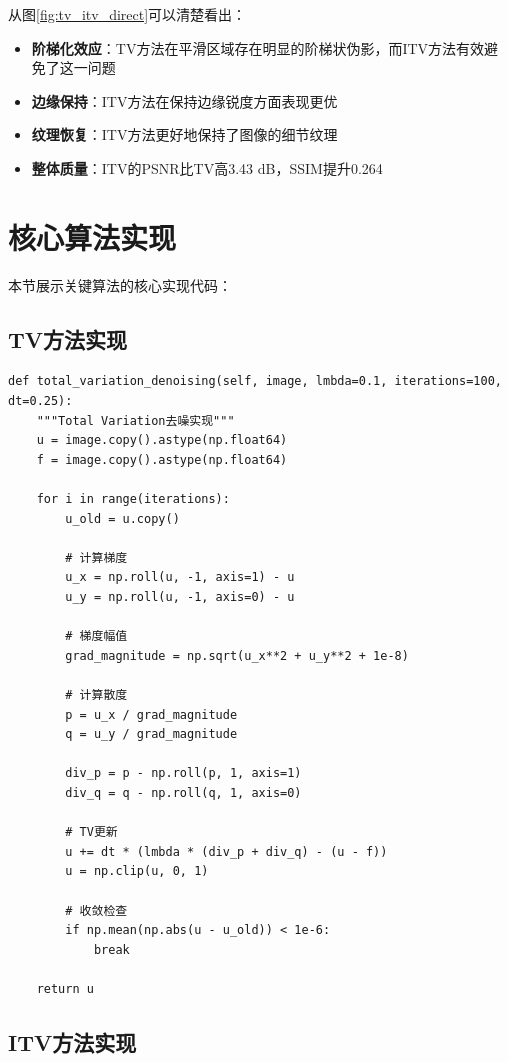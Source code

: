 \documentclass[a4paper,12pt]{ctexart}
\begin{document}
从图\ref{fig:tv_itv_direct}可以清楚看出：
\begin{itemize}
    \item \textbf{阶梯化效应}：TV方法在平滑区域存在明显的阶梯状伪影，而ITV方法有效避免了这一问题
    \item \textbf{边缘保持}：ITV方法在保持边缘锐度方面表现更优
    \item \textbf{纹理恢复}：ITV方法更好地保持了图像的细节纹理
    \item \textbf{整体质量}：ITV的PSNR比TV高3.43 dB，SSIM提升0.264
\end{itemize}

\section{核心算法实现}

本节展示关键算法的核心实现代码：

\subsection{TV方法实现}

\begin{lstlisting}[caption=TV方法核心代码,label=lst:tv]
def total_variation_denoising(self, image, lmbda=0.1, iterations=100, dt=0.25):
    """Total Variation去噪实现"""
    u = image.copy().astype(np.float64)
    f = image.copy().astype(np.float64)
    
    for i in range(iterations):
        u_old = u.copy()
        
        # 计算梯度
        u_x = np.roll(u, -1, axis=1) - u
        u_y = np.roll(u, -1, axis=0) - u
        
        # 梯度幅值
        grad_magnitude = np.sqrt(u_x**2 + u_y**2 + 1e-8)
        
        # 计算散度
        p = u_x / grad_magnitude
        q = u_y / grad_magnitude
        
        div_p = p - np.roll(p, 1, axis=1)
        div_q = q - np.roll(q, 1, axis=0)
        
        # TV更新
        u += dt * (lmbda * (div_p + div_q) - (u - f))
        u = np.clip(u, 0, 1)
        
        # 收敛检查
        if np.mean(np.abs(u - u_old)) < 1e-6:
            break
    
    return u
\end{lstlisting}

\subsection{ITV方法实现}
\end{document}
